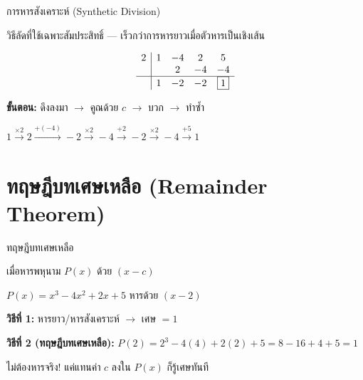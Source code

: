 \documentclass[11pt, aspectratio=169]{beamer}
\begin{document}
\begin{frame}{การหารสังเคราะห์ (Synthetic Division)}
  \begin{explanation}
    วิธีลัดที่ใช้เฉพาะสัมประสิทธิ์ — เร็วกว่าการหารยาวเมื่อตัวหารเป็นเชิงเส้น
  \end{explanation}

  \begin{exambox}
    \[
    \begin{array}{c|cccc}
      2 & 1 & -4 & 2 & 5 \\
        &   & 2  & -4 & -4 \\
      \hline
        & 1 & -2 & -2 & \boxed{1}
    \end{array}
    \]

    \textbf{ขั้นตอน:} ดึงลงมา $\rightarrow$ คูณด้วย $c$ $\rightarrow$ บวก $\rightarrow$ ทำซํ้า

    \begin{center}
    {\small $1 \xrightarrow{\times 2} 2 \xrightarrow{+(-4)} -2 \xrightarrow{\times 2} -4 \xrightarrow{+2} -2 \xrightarrow{\times 2} -4 \xrightarrow{+5} 1$}
    \end{center}

  \end{exambox}
\end{frame}

\section{ทฤษฎีบทเศษเหลือ (Remainder Theorem)}

\begin{frame}{ทฤษฎีบทเศษเหลือ}
  \begin{explanation}[ทฤษฎีบท]
    เมื่อหารพหุนาม $P(x)$ ด้วย $(x - c)$ 
  \end{explanation}

  \begin{exambox}[ตัวอย่าง]
    $P(x) = x^3 - 4x^2 + 2x + 5$ หารด้วย $(x - 2)$

    \textbf{วิธีที่ 1:} หารยาว/หารสังเคราะห์ $\rightarrow$ เศษ $= 1$

    \textbf{วิธีที่ 2 (ทฤษฎีบทเศษเหลือ):}
    $P(2) = 2^3 - 4(4) + 2(2) + 5 = 8 - 16 + 4 + 5 = 1$

  \end{exambox}

  \begin{intuition}[ประโยชน์]
    ไม่ต้องหารจริง! แค่แทนค่า $c$ ลงใน $P(x)$ ก็รู้เศษทันที
  \end{intuition}
\end{frame}
\end{document}
